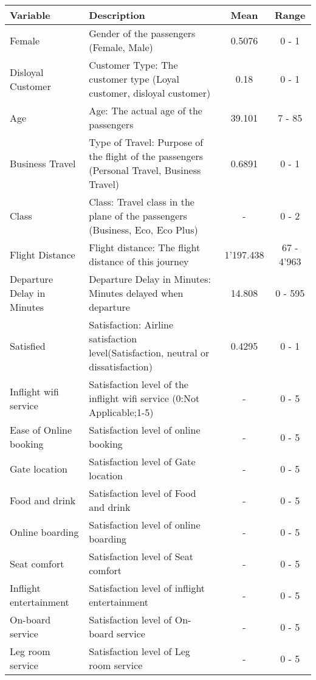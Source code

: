   \newpage
  \begin{landscape}
  \pagestyle{empty}%
  \begin{table}[h]
    \centering
    \begin{tabular}{|l|l|c|c|}
      \hline
      \textbf{Variable} & \textbf{Description} & \textbf{Mean} & \textbf{Range} \\
      \hline
      Female & Gender of the passengers (Female, Male) & 0.5076 & 0 - 1 \\ 
      Disloyal Customer & Customer Type: The customer type (Loyal customer, disloyal customer) & 0.18 & 0 - 1 \\
      Age & Age: The actual age of the passengers & 39.101 & 7 - 85 \\
      Business Travel & Type of Travel: Purpose of the flight of the passengers (Personal Travel, Business Travel) & 0.6891 & 0 - 1 \\
      Class & Class: Travel class in the plane of the passengers (Business,
      Eco, Eco Plus) & - & 0 - 2 \\
      Flight Distance & Flight distance: The flight distance of this journey & 1'197.438 & 67 - 4'963 \\
      Departure Delay in Minutes & Departure Delay in Minutes: Minutes delayed when departure & 14.808 & 0 - 595 \\
      Satisfied & Satisfaction: Airline satisfaction level(Satisfaction, neutral or dissatisfaction) & 0.4295 & 0 - 1 \\
      Inflight wifi service & Satisfaction level of the inflight wifi service
      (0:Not Applicable;1-5) & - & 0 - 5 \\
      Ease of Online booking & Satisfaction level of online booking & - & 0 - 5
      \\
      Gate location & Satisfaction level of Gate location & - & 0 - 5 \\
      Food and drink & Satisfaction level of Food and drink & - & 0 - 5 \\
      Online boarding & Satisfaction level of online boarding & - & 0 - 5 \\
      Seat comfort & Satisfaction level of Seat comfort & - & 0 - 5 \\
      Inflight entertainment & Satisfaction level of inflight entertainment & -
                             & 0 - 5 \\
      On-board service & Satisfaction level of On-board service & - & 0 - 5 \\
      Leg room service & Satisfaction level of Leg room service & - & 0 - 5 \\

\end{tabular}
\end{table}
\end{landscape}
